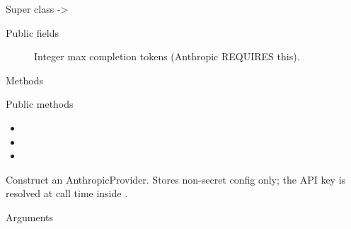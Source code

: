 \documentclass[a4paper]{book}
\begin{document}
%
\begin{Section}{Super class}
 -> 
\end{Section}
%
\begin{Section}{Public fields}

\begin{description}

\item[] Integer max completion tokens (Anthropic REQUIRES this).

\end{description}


\end{Section}
%
\begin{Section}{Methods}
%
\begin{SubSection}{Public methods}
\begin{itemize}

\item{} 
\item{} 
\item{} 

\end{itemize}

\end{SubSection}



\hypertarget{method-AnthropicProvider-initialize}{}
%
\begin{SubSection}{}
Construct an AnthropicProvider. Stores non-secret config only;
the API key is resolved at call time inside .
%

%
\begin{SubSubSection}{Arguments}

\begin{description}


\end{description}
\end{SubSubSection}
\end{SubSection}
\end{Section}
\end{document}
